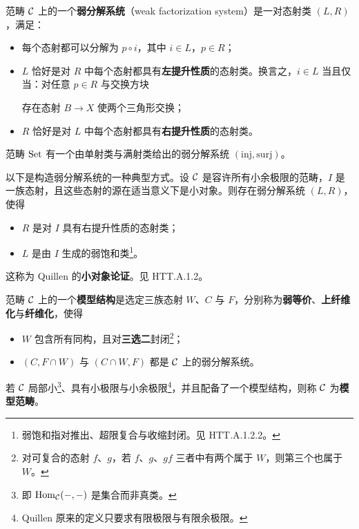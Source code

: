 \begin{definition}\label{L2-2.2}
范畴 $\mathcal{C}$ 上的一个\textbf{弱分解系统}（weak factorization system）是一对态射类 $(L,R)$，满足：
\begin{itemize}[leftmargin=2.2em,itemsep=0.1em]
\item 每个态射都可以分解为 $p\circ i$，其中 $i\in L$，$p\in R$；
\item $L$ 恰好是对 $R$ 中每个态射都具有\textbf{左提升性质}的态射类。换言之，$i\in L$ 当且仅当：对任意 $p\in R$ 与交换方块
\begin{center}
\end{center}
存在态射 $B\to X$ 使两个三角形交换；
\item $R$ 恰好是对 $L$ 中每个态射都具有\textbf{右提升性质}的态射类。
\end{itemize}
\end{definition}

\begin{example}\label{L2-2.3}
范畴 $\operatorname{Set}$ 有一个由单射类与满射类给出的弱分解系统 $(\mathrm{inj},\mathrm{surj})$。
\end{example}

\begin{remark}\label{L2-2.4}
以下是构造弱分解系统的一种典型方式。设 $\mathcal{C}$ 是容许所有小余极限的范畴，$I$ 是一族态射，且这些态射的源在适当意义下是小对象。则存在弱分解系统 $(L,R)$，使得
\begin{itemize}[leftmargin=2.2em,itemsep=0.1em]
\item $R$ 是对 $I$ 具有右提升性质的态射类；
\item $L$ 是由 $I$ 生成的弱饱和类\footnote{弱饱和指对推出、超限复合与收缩封闭。见 HTT.A.1.2.2。}。
\end{itemize}
这称为 Quillen 的\textbf{小对象论证}。见 HTT.A.1.2。
\end{remark}

\begin{definition}\label{L2-2.5}
范畴 $\mathcal{C}$ 上的一个\textbf{模型结构}是选定三族态射 $W$、$C$ 与 $F$，分别称为\textbf{弱等价}、\textbf{上纤维化}与\textbf{纤维化}，使得
\begin{itemize}[leftmargin=2.2em,itemsep=0.1em]
\item $W$ 包含所有同构，且对\textbf{三选二}封闭\footnote{对可复合的态射 $f$、$g$，若 $f$、$g$、$gf$ 三者中有两个属于 $W$，则第三个也属于 $W$。}；
\item $(C,F\cap W)$ 与 $(C\cap W,F)$ 都是 $\mathcal{C}$ 上的弱分解系统。
\end{itemize}
若 $\mathcal{C}$ 局部小\footnote{即 $\operatorname{Hom}_{\mathcal{C}}(-,-)$ 是集合而非真类。}、具有小极限与小余极限\footnote{Quillen 原来的定义只要求有限极限与有限余极限。}，并且配备了一个模型结构，则称 $\mathcal{C}$ 为\textbf{模型范畴}。
\end{definition}

